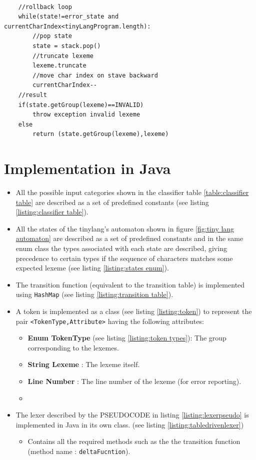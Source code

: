 \begin{lstlisting}[caption=Table Driven Lexer PSEUDOCODE,label=listing:lexerpseudo]
        
    //rollback loop
    while(state!=error_state and currentCharIndex<tinyLangProgram.length):
        //pop state
        state = stack.pop()
        //truncate lexeme
        lexeme.truncate
        //move char index on stave backward
        currentCharIndex--
    //result
    if(state.getGroup(lexeme)==INVALID)
        throw exception invalid lexeme
    else 
        return (state.getGroup(lexeme),lexeme)
\end{lstlisting}



\section{Implementation in Java}
\begin{itemize}
    \item All the possible input categories shown in the classifier table \ref{table:classifier table} are described as a set of predefined constants (see listing \ref{listing:classifier table}).
    \item All the states of the tinylang's automaton shown in figure \ref{fig:tiny lang automaton}  are described as a set of predefined constants and in the same enum class the types associated with each state are described, giving precedence to certain types if the sequence of characters matches some expected lexeme (see listing \ref{listing:states enum}).
    \item The transition function (equivalent to the transition table) is implemented using \verb!HashMap! (see listing \ref{listing:transition table}).
    \item A token is implemented as a class (see listing \ref{listing:token}) to represent the pair \verb!<TokenType,Attribute>! having the following attributes:
    \begin{itemize}
        \item \textbf{Enum TokenType} (see listing \ref{listing:token types}): The group corresponding to the lexemes.
        \item \textbf{String Lexeme} : The lexeme itself.
        \item \textbf{Line Number} : The line number of the lexeme (for error reporting).
        \item \textbf{}
    \end{itemize}
    \item The lexer described by the PSEUDOCODE in listing \ref{listing:lexerpseudo} is implemented in Java in its own class. (see listing \ref{listing:tabledrivenlexer})
        \begin{itemize}
            \item Contains all the required methods such as the the transition function (method name : \verb!deltaFucntion!). 
        \end{itemize}
\end{itemize}



